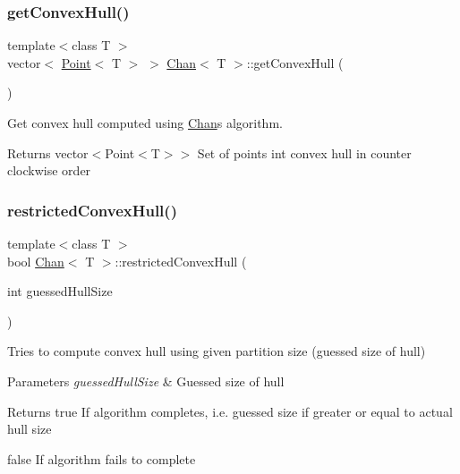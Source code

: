 \subsubsection{\texorpdfstring{get\+Convex\+Hull()}{getConvexHull()}}
{\footnotesize\ttfamily template$<$class T $>$ \\
vector$<$ \mbox{\hyperlink{classPoint}{Point}}$<$ T $>$ $>$ \mbox{\hyperlink{classChan}{Chan}}$<$ T $>$\+::get\+Convex\+Hull (\begin{DoxyParamCaption}{ }\end{DoxyParamCaption})}



Get convex hull computed using \mbox{\hyperlink{classChan}{Chan}}\textquotesingle{}s algorithm. 

\begin{DoxyReturn}{Returns}
vector$<$Point$<$\+T$>$$>$ Set of points int convex hull in counter clockwise order 
\end{DoxyReturn}
\mbox{\label{classChan_a773b2ebe27132ccfacedd5efebd63093}} 
\subsubsection{\texorpdfstring{restricted\+Convex\+Hull()}{restrictedConvexHull()}}
{\footnotesize\ttfamily template$<$class T $>$ \\
bool \mbox{\hyperlink{classChan}{Chan}}$<$ T $>$\+::restricted\+Convex\+Hull (\begin{DoxyParamCaption}\item[{int}]{guessed\+Hull\+Size }\end{DoxyParamCaption})\hspace{0.3cm}{\ttfamily [private]}}



Tries to compute convex hull using given partition size (guessed size of hull) 


\begin{DoxyParams}{Parameters}
{\em guessed\+Hull\+Size} & Guessed size of hull \\
\hline
\end{DoxyParams}
\begin{DoxyReturn}{Returns}
true If algorithm completes, i.\+e. guessed size if greater or equal to actual hull size 

false If algorithm fails to complete 
\end{DoxyReturn}


